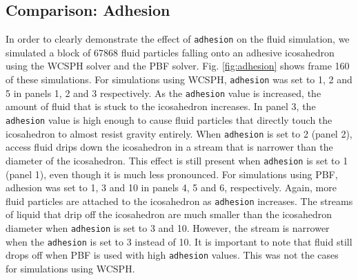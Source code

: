 \documentclass[11pt, letterpaper, twocolumn]{article}
\begin{document}
\subsection{Comparison: Adhesion}
\label{subsec:comparison_adhesion}

In order to clearly demonstrate the effect of \texttt{adhesion} on the fluid simulation, we simulated a block of 67868 fluid particles falling onto an adhesive icosahedron using the WCSPH solver and the PBF solver. Fig. \ref{fig:adhesion} shows frame 160 of these simulations. For simulations using WCSPH, \texttt{adhesion} was set to 1, 2 and 5 in panels 1, 2 and 3 respectively. As the 
\texttt{adhesion} value is increased, the amount of fluid that is stuck to the icosahedron increases. In panel 3, the \texttt{adhesion} value is high enough to cause fluid particles that directly touch the icosahedron to almost resist gravity entirely. When \texttt{adhesion} is set to 2 (panel 2), access fluid drips down the icosahedron in a stream
that is narrower than the diameter of the icosahedron. This effect is still present when \texttt{adhesion} is set to 1 (panel 1), even though it is much less pronounced. For simulations using PBF, adhesion was set to 1, 3 and 10 in panels 4, 5 and 6, respectively. Again, more fluid particles are attached to the icosahedron as \texttt{adhesion} increases.
The streams of liquid that drip off the icosahedron are much smaller than the icosahedron diameter when \texttt{adhesion} is set to 3 and 10. However, the stream is narrower when the \texttt{adhesion} is set to 3 instead of 10. It is important to note that fluid still drops off when PBF is used with high  \texttt{adhesion} values. This was not the cases
for simulations using WCSPH. 

\end{document}
